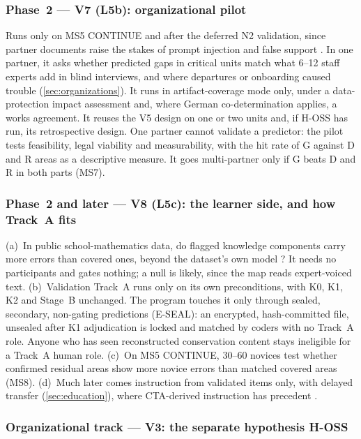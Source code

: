 \subsubsection{Phase~2 --- V7 (L5b): organizational pilot}

\evfut{} Runs only on MS5 CONTINUE and after the deferred N2 validation, since partner documents
raise the stakes of prompt injection and false support \parencite{greshake2023not}. In one partner,
it asks whether predicted gaps in critical units match what 6--12 staff experts add in blind
interviews, and where departures or onboarding caused trouble (\cref{sec:organizations}). It runs in
artifact-coverage mode only, under a data-protection impact assessment and, where German
co-determination applies, a works agreement. It reuses the V5 design on one or two units and, if
H-OSS has run, its retrospective design. \evint{} One partner cannot validate a predictor: the pilot
tests feasibility, legal viability and measurability, with the hit rate of G against D and R areas
as a descriptive measure. It goes multi-partner only if G beats D and R in both parts (MS7).

\subsubsection{Phase~2 and later --- V8 (L5c): the learner side, and how Track~A fits}

\evfut{} (a)~In public school-mathematics data, do flagged knowledge components carry more errors
than covered ones, beyond the dataset's own model \parencite{cen2006learning}? It needs no
participants and gates nothing; a null is likely, since the map reads expert-voiced text.
(b)~Validation Track~A runs only on its own preconditions, with K0, K1, K2 and Stage~B unchanged.
The program touches it only through sealed, secondary, non-gating predictions (E-SEAL): an
encrypted, hash-committed file, unsealed after K1 adjudication is locked and matched by coders with
no Track~A role. Anyone who has seen reconstructed conservation content stays ineligible for a
Track~A human role. (c)~On MS5 CONTINUE,
30--60 novices test whether confirmed residual areas show more novice errors than matched covered
areas (MS8). (d)~Much later comes instruction from validated items only, with delayed transfer
(\cref{sec:education}), where CTA-derived instruction has precedent
\parencite{feldon2010translating}.

\subsubsection{Organizational track --- V3: the separate hypothesis H-OSS}\label{subsec:hoss}

